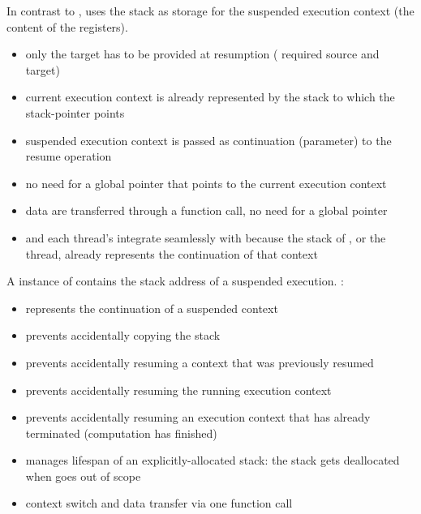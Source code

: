 \newpage
{}


In contrast to \uc, \cc uses the stack as storage for the suspended
execution context (the content of the registers).

\begin{itemize}
    \item only the target has to be provided at resumption
        ( required source and target)
    \item current execution context is already represented by the
        stack to which the stack-pointer points
    \item suspended execution context is passed as continuation (parameter) 
        to the resume operation
    \item no need for a global pointer that points to the current execution context
    \item data are transferred through a function call, no need for a global pointer
    \item \main and each thread's \entryfn integrate seamlessly with \cc
        because the stack of \main, or the thread, already represents the continuation of
        that context
\end{itemize}


A instance of \cont contains the stack address of a suspended execution.
\cont:

\begin{itemize}
    \item represents the continuation of a suspended context
    \item prevents accidentally copying the stack
    \item prevents accidentally resuming a context that was previously resumed
    \item prevents accidentally resuming the running execution
        context
    \item prevents accidentally resuming an execution context that has already
        terminated (computation has finished)
    \item manages lifespan of an explicitly-allocated stack: the stack gets
        deallocated when \cont goes out of scope
    \item context switch and data transfer via one function call
\end{itemize}

